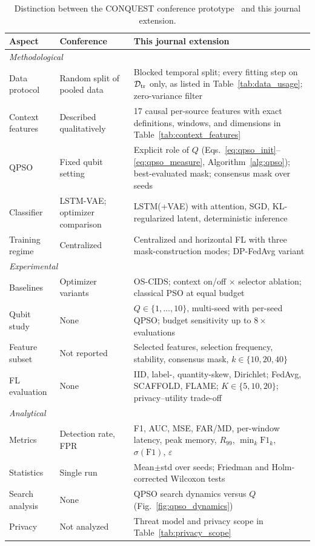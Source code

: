 \documentclass[conference]{IEEEtran}
\begin{document}
\begin{table}[!t]
\centering
\scriptsize
\caption{Distinction between the CONQUEST conference prototype~\cite{ajakweconquest} and this journal extension.}
\label{tab:conf_vs_journal}
\setlength{\tabcolsep}{3pt}
\renewcommand{\arraystretch}{1.10}
\begin{tabular}{p{1.5cm} p{2.4cm} p{3.9cm}}
\hline\toprule
\textbf{Aspect} & \textbf{Conference~\cite{ajakweconquest}} & \textbf{This journal extension} \\
\hline\toprule
\multicolumn{3}{l}{\textit{Methodological}} \\
Data protocol & Random split of pooled data & Blocked temporal split; every fitting step on $\mathcal{D}_{\rm tr}$ only, as listed in Table~\ref{tab:data_usage}; zero-variance filter \\
Context features & Described qualitatively & 17 causal per-source features with exact definitions, windows, and dimensions in Table~\ref{tab:context_features} \\
QPSO & Fixed qubit setting & Explicit role of $Q$ (Eqs.~\eqref{eq:qpso_init}--\eqref{eq:qpso_measure}, Algorithm~\ref{alg:qpso}); best-evaluated mask; consensus mask over seeds \\
Classifier & LSTM-VAE; optimizer comparison & LSTM(+VAE) with attention, SGD, KL-regularized latent, deterministic inference \\
Training regime & Centralized & Centralized and horizontal FL with three mask-construction modes; DP-FedAvg variant \\
\midrule
\multicolumn{3}{l}{\textit{Experimental}} \\
Baselines & Optimizer variants & OS-CIDS; context on/off $\times$ selector ablation; classical PSO at equal budget \\
Qubit study & None & $Q\in\{1,\dots,10\}$, multi-seed with per-seed QPSO; budget sensitivity up to $8\times$ evaluations \\
Feature subset & Not reported & Selected features, selection frequency, stability, consensus mask, $k\in\{10,20,40\}$ \\
FL evaluation & None & IID, label-, quantity-skew, Dirichlet; FedAvg, SCAFFOLD, FLAME; $K\in\{5,10,20\}$; privacy--utility trade-off \\
\midrule
\multicolumn{3}{l}{\textit{Analytical}} \\
Metrics & Detection rate, FPR & F1, AUC, MSE, FAR/MD, per-window latency, peak memory, $R_{99}$, $\min_k\mathrm{F1}_k$, $\sigma(\mathrm{F1})$, $\varepsilon$ \\
Statistics & Single run & Mean$\pm$std over seeds; Friedman and Holm-corrected Wilcoxon tests \\
Search analysis & None & QPSO search dynamics versus $Q$ (Fig.~\ref{fig:qpso_dynamics}) \\
Privacy & Not analyzed & Threat model and privacy scope in Table~\ref{tab:privacy_scope} \\
\hline\toprule
\end{tabular}
\end{table}
\end{document}

